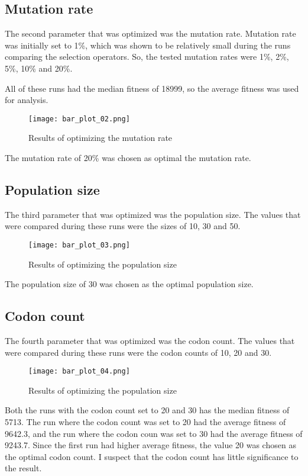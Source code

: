 \subsection{Mutation rate}
The second parameter that was optimized was the mutation rate. Mutation rate was initially set to 1\%, which was shown to be relatively small during the runs comparing the selection operators. So, the tested mutation rates were 1\%, 2\%, 5\%, 10\% and 20\%.

All of these runs had the median fitness of 18999, so the average fitness was used for analysis.

\begin{figure}[H]
	\centering
	\texttt{[image: bar\_plot\_02.png]}
	\caption{Results of optimizing the mutation rate}
\end{figure}

The mutation rate of 20\% was chosen as optimal the mutation rate.

\subsection{Population size}
The third parameter that was optimized was the population size. The values that were compared during these runs were the sizes of 10, 30 and 50.

\begin{figure}[H]
	\centering
	\texttt{[image: bar\_plot\_03.png]}
	\caption{Results of optimizing the population size}
\end{figure}

The population size of 30 was chosen as the optimal population size.

\subsection{Codon count}
The fourth parameter that was optimized was the codon count. The values that were compared during these runs were the codon counts of 10, 20 and 30.

\begin{figure}[H]
	\centering
	\texttt{[image: bar\_plot\_04.png]}
	\caption{Results of optimizing the population size}
\end{figure}

Both the runs with the codon count set to 20 and 30 has the median fitness of 5713. The run where the codon count was set to 20 had the average fitness of 9642.3, and the run where the codon coun was set to 30 had the average fitness of 9243.7. Since the first run had higher average fitness, the value 20 was chosen as the optimal codon count. I suspect that the codon count has little significance to the result.

